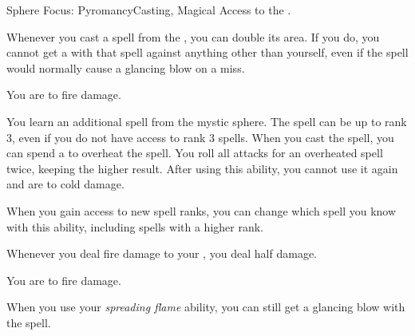     \begin{magicalfeat}{Sphere Focus: Pyromancy}{Casting, Magical}
        \featpre Access to the  .

         Whenever you cast a spell from the  , you can double its area.
        If you do, you cannot get a  with that spell against anything other than yourself, even if the spell would normally cause a glancing blow on a miss.

         You are  to fire damage.

         You learn an additional spell from the  mystic sphere.
        The spell can be up to rank 3, even if you do not have access to rank 3 spells.
        When you cast the spell, you can spend a  to  overheat the spell.
        You roll all attacks for an overheated spell twice, keeping the higher result.
        After using this ability, you  cannot use it again and are \vulnerable to cold damage.

        When you gain access to new spell ranks, you can change which spell you know with this ability, including spells with a higher rank.

         Whenever you deal fire damage to your , you deal half damage.

         You are  to fire damage.

         When you use your \textit{spreading flame} ability, you can still get a glancing blow with the spell.
    \end{magicalfeat}

